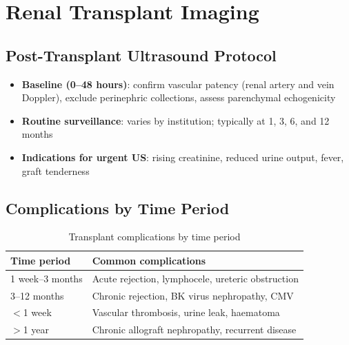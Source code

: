 \section{Renal Transplant Imaging}

\subsection{Post-Transplant Ultrasound Protocol}
\begin{itemize}
  \item \textbf{Baseline (0--48 hours)}: confirm vascular patency (renal artery and vein Doppler), exclude perinephric collections, assess parenchymal echogenicity
  \item \textbf{Routine surveillance}: varies by institution; typically at 1, 3, 6, and 12 months
  \item \textbf{Indications for urgent US}: rising creatinine, reduced urine output, fever, graft tenderness
\end{itemize}

\subsection{Complications by Time Period}

\begin{table}[h]
\centering
\caption{Transplant complications by time period}
\begin{tabular}{|p{}|p{}|}
\hline
\textbf{Time period} & \textbf{Common complications} \\
\hline
1 week--3 months & Acute rejection, lymphocele, ureteric obstruction \\
3--12 months & Chronic rejection, BK virus nephropathy, CMV \\
$<$1 week & Vascular thrombosis, urine leak, haematoma \\
$>$1 year & Chronic allograft nephropathy, recurrent disease \\
\hline
\end{tabular}
\end{table}

